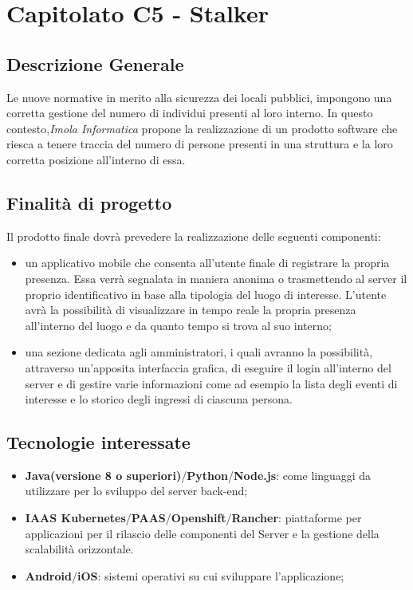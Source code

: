 \section{Capitolato C5 - Stalker}
\subsection{Descrizione Generale}
Le nuove normative in merito alla sicurezza dei locali pubblici, impongono una corretta gestione del numero di individui presenti al loro interno. In questo contesto,\textit{Imola Informatica} propone la realizzazione di un prodotto software che riesca a tenere traccia del numero di persone presenti in una struttura e la loro corretta posizione all'interno di essa.
\subsection{Finalità di progetto}
Il prodotto finale dovrà prevedere la realizzazione delle seguenti componenti:
\begin{itemize}
	\item un applicativo mobile che consenta all'utente finale di registrare la propria presenza. Essa verrà segnalata in maniera anonima o trasmettendo al server il proprio identificativo in base alla tipologia del luogo di interesse. L'utente avrà la possibilità di visualizzare in tempo reale la propria presenza all'interno del luogo e da quanto tempo si trova al suo interno;
	\item una sezione dedicata agli amministratori, i quali avranno la possibilità, attraverso un'apposita interfaccia grafica, di eseguire il login all'interno del server e di gestire varie informazioni come ad esempio la lista degli eventi di interesse e lo storico degli ingressi di ciascuna persona.
\end{itemize}
\subsection{Tecnologie interessate}
\begin{itemize}
	\item \textbf{Java(versione 8 o superiori)}/\textbf{Python}/\textbf{Node.js}: come linguaggi da utilizzare per lo sviluppo del server back-end\glos;
	\item \textbf{IAAS Kubernetes\glos}/\textbf{PAAS\glos}/\textbf{Openshift\glos}/\textbf{Rancher\glos}: piattaforme per applicazioni per il rilascio delle componenti del Server e la gestione della scalabilità orizzontale.
	\item \textbf{Android\glos}/\textbf{iOS\glos}: sistemi operativi su cui sviluppare l'applicazione;
\end{itemize}

